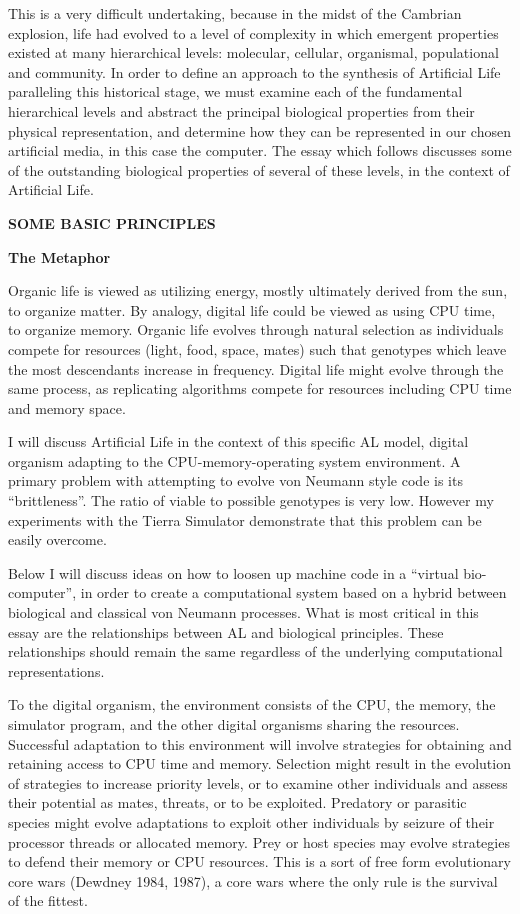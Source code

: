 This is a very difficult undertaking, because in the midst of the Cambrian
explosion, life had evolved to a level of complexity in which emergent
properties existed at many hierarchical levels: molecular, cellular,
organismal, populational and community.  In order to define an approach
to the synthesis of Artificial Life paralleling this historical stage,
we must examine each of the fundamental hierarchical levels and abstract
the principal biological properties from their physical representation,
and determine how they can be represented in our chosen artificial media,
in this case the computer.  The essay which follows discusses some of the
outstanding biological properties of several of these levels, in the context
of Artificial Life.

\LP
\bf SOME BASIC PRINCIPLES\rm

\bf The Metaphor\rm
\eLP

Organic life is viewed as utilizing energy, mostly ultimately derived
from the sun, to organize matter.  By analogy, digital life could be
viewed as using CPU time, to organize memory.  Organic life evolves
through natural selection as individuals compete for resources (light,
food, space, mates) such that genotypes which leave the most descendants
increase in frequency.  Digital life might evolve through the same process,
as replicating algorithms compete for resources including CPU time and
memory space.

I will discuss Artificial Life in the context of this specific AL model,
digital organism adapting to the CPU-memory-operating system environment.
A primary problem with attempting to evolve von Neumann style code is its
``brittleness''.  The ratio of viable to possible genotypes is very low.
However my experiments with the Tierra Simulator demonstrate that this
problem can be easily overcome.

Below I will discuss ideas on how to loosen up machine code in a
``virtual bio-computer'', in order to create a computational system based
on a hybrid between biological and classical von Neumann processes.
What is most critical in this essay are the relationships between AL and
biological principles.  These relationships should remain the same regardless
of the underlying computational representations.

To the digital organism, the environment consists of the CPU, the memory,
the simulator program, and the other digital organisms sharing the resources.
Successful adaptation to this environment will involve
strategies for obtaining and retaining access to CPU time and memory.
Selection might result in the evolution of strategies to
increase priority levels, or to examine other individuals and
assess their potential as mates, threats, or to be exploited.  Predatory
or parasitic species might evolve adaptations to exploit other individuals
by seizure of their processor threads or allocated memory.  Prey or host
species may evolve strategies to defend their memory or CPU resources.
This is a sort of free form evolutionary core wars (Dewdney 1984, 1987),
a core wars where the only rule is the survival of the fittest.


